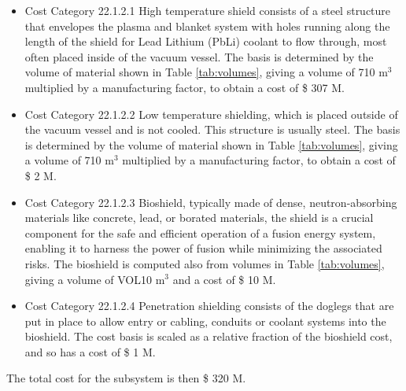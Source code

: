 \begin{itemize}
    \item Cost Category 22.1.2.1 High temperature shield consists of a steel structure that envelopes the plasma and blanket system with holes running along the length of the shield for Lead Lithium (PbLi) coolant to flow through, most often placed inside of the vacuum vessel. The basis is determined by the volume of material shown in Table \ref{tab:volumes}, giving a volume of 710  m$^{3}$ multiplied by a manufacturing factor, to obtain a cost of \$ 307 M. %
    \item Cost Category 22.1.2.2 Low temperature shielding, which is placed outside of the vacuum vessel and is not cooled.  This structure is usually steel.  The basis is determined by the volume of material shown in Table \ref{tab:volumes}, giving a volume of 710  m$^{3}$ multiplied by a manufacturing factor, to obtain a cost of \$ 2 M.
    \item Cost Category 22.1.2.3 Bioshield, typically made of dense, neutron-absorbing materials like concrete, lead, or borated materials, the shield is a crucial component for the safe and efficient operation of a fusion energy system, enabling it to harness the power of fusion while minimizing the associated risks.  The bioshield is computed also from volumes in Table \ref{tab:volumes}, giving a volume of VOL10 m$^{3}$ and a cost of \$ 10 M. 
    \item Cost Category 22.1.2.4 Penetration shielding consists of the doglegs that are put in place to allow entry or cabling, conduits or coolant systems into the bioshield.  The cost basis is scaled as a relative fraction of the bioshield cost, and so has a cost of \$ 1 M.
\end{itemize}

The total cost for the subsystem is then \$ 320 M.




